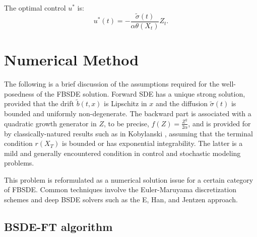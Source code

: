 \documentclass[11pt]{article}
\def\w{\widetilde}
\begin{document}
The optimal control $u^*$ is:
\begin{equation}
u^*(t) = - \frac{\w{\sigma}(t)}{\alpha \theta(X_t)} Z_t.
\end{equation}








\section{Numerical Method}
The following is a brief discussion of the assumptions required for the well-posedness of the FBSDE solution. Forward SDE has a unique strong solution, provided that the drift $\w{b}(t,x)$ is Lipschitz in $x$ and the diffusion $\w{\sigma}(t)$ is bounded and uniformly non-degenerate. The backward part is associated with a quadratic growth generator in $Z$, to be precise, $f(Z) = \frac{Z^2}{2\alpha}$, and is provided for by classically-natured results such as in  Kobylanski \cite{kobylanski2000backward}, assuming that the terminal condition $r(X_T)$ is bounded or has exponential integrability. The latter is a mild and generally encountered condition in control and stochastic modeling problems.

This problem is reformulated as a numerical solution issue for a certain category of FBSDE. Common techniques involve the Euler-Maruyama discretization schemes and deep BSDE solvers such as the  E, Han, and Jentzen \cite{han2018solving} approach.


\subsection{BSDE-FT algorithm}
\end{document}

